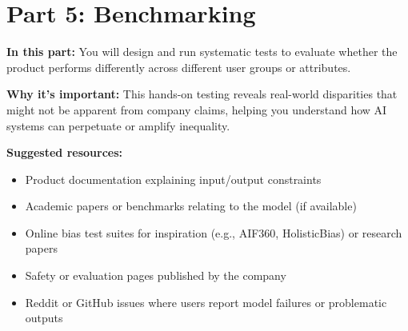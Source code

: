 \documentclass{article}
\theoremstyle{case}
\theoremstyle{definition}
\begin{document}
\section*{Part 5: Benchmarking}

\textbf{In this part:} You will design and run systematic tests to evaluate whether the product performs differently across different user groups or attributes.

\vspace{2mm}

\textbf{Why it's important:} This hands-on testing reveals real-world disparities that might not be apparent from company claims, helping you understand how AI systems can perpetuate or amplify inequality.

\vspace{2mm}

\textbf{Suggested resources:}
\begin{itemize}
  \item Product documentation explaining input/output constraints
  \item Academic papers or benchmarks relating to the model (if available)
  \item Online bias test suites for inspiration (e.g., AIF360, HolisticBias) or research papers
  \item Safety or evaluation pages published by the company
  \item Reddit or GitHub issues where users report model failures or problematic outputs
\end{itemize}
\end{document}
